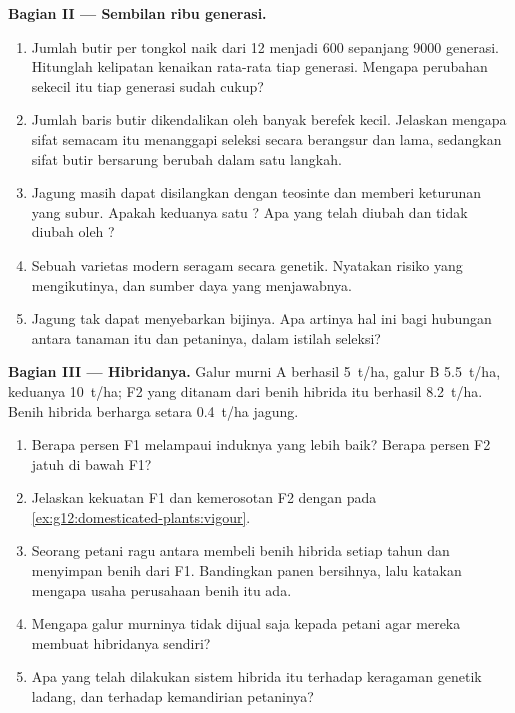 \begin{problem}
\medskip
\noindent\textbf{Bagian II --- Sembilan ribu generasi.}
\begin{enumerate}[resume]
  \item Jumlah butir per tongkol naik dari 12 menjadi 600 sepanjang
        9000 generasi. Hitunglah kelipatan kenaikan rata-rata tiap
        generasi. Mengapa perubahan sekecil itu tiap generasi sudah
        cukup?
  \item Jumlah baris butir dikendalikan oleh banyak  berefek kecil.
        Jelaskan mengapa sifat semacam itu menanggapi seleksi secara
        berangsur dan lama, sedangkan sifat butir bersarung berubah
        dalam satu langkah.
  \item Jagung masih dapat disilangkan dengan teosinte dan memberi
        keturunan yang subur. Apakah keduanya satu ? Apa yang
        telah diubah dan tidak diubah oleh ?
  \item Sebuah varietas modern seragam secara genetik. Nyatakan risiko
        yang mengikutinya, dan sumber daya yang menjawabnya.
  \item Jagung tak dapat menyebarkan bijinya. Apa artinya hal ini bagi
        hubungan antara tanaman itu dan petaninya, dalam istilah
        seleksi?
\end{enumerate}

\medskip
\noindent\textbf{Bagian III --- Hibridanya.}
Galur murni A berhasil \qty{5}{t/ha}, galur B \qty{5.5}{t/ha},  keduanya \qty{10}{t/ha}; F2 yang ditanam dari benih hibrida itu
berhasil \qty{8.2}{t/ha}. Benih hibrida berharga setara \qty{0.4}{t/ha}
jagung.
\begin{enumerate}[resume]
  \item Berapa persen F1 melampaui induknya yang lebih baik? Berapa
        persen F2 jatuh di bawah F1?
  \item Jelaskan kekuatan F1 dan kemerosotan F2 dengan  pada
        \cref{ex:g12:domesticated-plants:vigour}.
  \item Seorang petani ragu antara membeli benih hibrida setiap tahun
        dan menyimpan benih dari F1. Bandingkan panen bersihnya, lalu
        katakan mengapa usaha perusahaan benih itu ada.
  \item Mengapa galur murninya tidak dijual saja kepada petani agar
        mereka membuat hibridanya sendiri?
  \item Apa yang telah dilakukan sistem hibrida itu terhadap keragaman
        genetik ladang, dan terhadap kemandirian petaninya?
\end{enumerate}


\end{problem}
